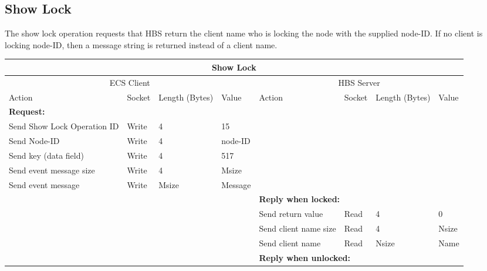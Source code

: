 \newpage
\subsection{Show Lock}

The show lock operation requests that HBS return the client name who
is locking the node with the supplied node-ID.  
If no client is locking node-ID, then a message string is returned instead
of a client name. 



\bigskip
\small
\begin{tabular}{|p{1.2in}|p{.4in}|p{.4in}|p{.5in}|p{1.2in}|p{.4in}|p{.4in}|p{.5in} |} \hline
\multicolumn{8}{|c|}{{\bf Show Lock}} \\ \hline
\multicolumn{4}{|c|}{ECS Client} & \multicolumn{4}{|c|}{HBS Server} \\ \hline
Action            & Socket & Length  
                            (Bytes)& Value & Action       & Socket & Length 
                                                                    (Bytes)& Value \\ \hline
\multicolumn{4}{|l}{{\bf Request:}}&\multicolumn{4}{|l|}{~} \\ \hline
Send Show Lock Operation ID  & Write  & 4     & 15     &              &        &       &       \\ \hline
Send Node-ID      & Write  & 4     &  node-ID &           &        &       &       \\ \hline
Send key (data field)    & Write  & 4     & 517   &              &        &       &       \\ \hline
Send event
message size      & Write  & 4     &  Msize &         &        &       &       \\ \hline
Send event message
                  & Write  &  Msize  &  Message &     &        &       &       \\ \hline
\multicolumn{4}{|l}{~}&\multicolumn{4}{|l|}{{\bf Reply when locked:}} \\ \hline
                  &        &       &       & Send return
                                             value        & Read   &  4    & 0       \\ \hline
                  &        &       &       & Send client name size & Read &  4    &  Nsize \\ \hline
                  &        &       &       & Send client name    & Read   & Nsize &  Name \\ \hline
\multicolumn{4}{|l}{~}&\multicolumn{4}{|l|}{{\bf Reply when unlocked:}} \\ \hline

\end{tabular}
